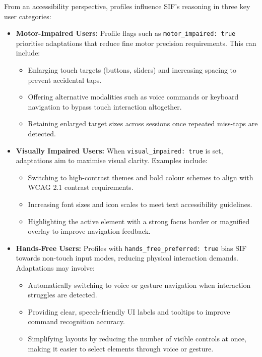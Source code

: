 \documentclass[openany]{book}
\begin{document}
From an accessibility perspective, profiles influence SIF’s reasoning in three key user categories:
\begin{itemize}
    \item \textbf{Motor-Impaired Users:} Profile flags such as \verb|motor_impaired: true| prioritise adaptations that reduce fine motor precision requirements. This can include:
    \begin{itemize}
        \item Enlarging touch targets (buttons, sliders) and increasing spacing to prevent accidental taps.
        \item Offering alternative modalities such as voice commands or keyboard navigation to bypass touch interaction altogether.
        \item Retaining enlarged target sizes across sessions once repeated miss-taps are detected.
    \end{itemize}

    \item \textbf{Visually Impaired Users:} When \verb|visual_impaired: true| is set, adaptations aim to maximise visual clarity. Examples include:
    \begin{itemize}
        \item Switching to high-contrast themes and bold colour schemes to align with WCAG 2.1 contrast requirements.
        \item Increasing font sizes and icon scales to meet text accessibility guidelines.
        \item Highlighting the active element with a strong focus border or magnified overlay to improve navigation feedback.
    \end{itemize}

    \item \textbf{Hands-Free Users:} Profiles with \verb|hands_free_preferred: true| bias SIF towards non-touch input modes, reducing physical interaction demands. Adaptations may involve:
    \begin{itemize}
        \item Automatically switching to voice or gesture navigation when interaction struggles are detected.
        \item Providing clear, speech-friendly UI labels and tooltips to improve command recognition accuracy.
        \item Simplifying layouts by reducing the number of visible controls at once, making it easier to select elements through voice or gesture.
    \end{itemize}
\end{itemize}
\end{document}
